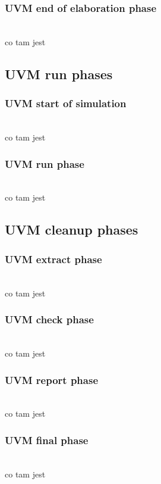 \documentclass[11pt,a4paper]{article}
\begin{document}
		\subsubsection{UVM end of elaboration phase}
		\hspace{5mm}
			\\co tam jest	
	
	\subsection{UVM run phases}

		\subsubsection{UVM start of simulation}
		\hspace{5mm}
			\\co tam jest	

		\subsubsection{UVM run phase}
		\hspace{5mm}
			\\co tam jest	

	\subsection{UVM cleanup phases}

		\subsubsection{UVM extract phase}
		\hspace{5mm}
			\\co tam jest	
			
		\subsubsection{UVM check phase}
		\hspace{5mm}
			\\co tam jest	
			
		\subsubsection{UVM report phase}
		\hspace{5mm}
			\\co tam jest	
			
		\subsubsection{UVM final phase}
		\hspace{5mm}
			\\co tam jest	
\end{document}
